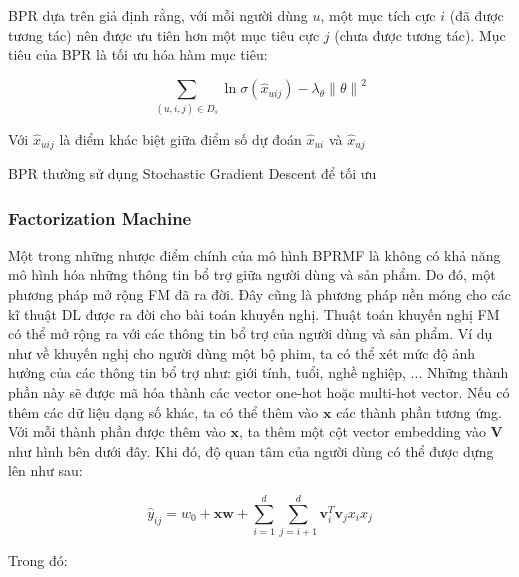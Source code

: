BPR dựa trên giả định rằng, với mỗi người dùng $ u $, một mục tích cực $ i $ (đã được
tương tác) nên được ưu tiên hơn một mục tiêu cực $ j $ (chưa được tương tác). Mục
tiêu của BPR là tối ưu hóa hàm mục tiêu:

\[
    \sum_{ (u, i, j) \in D_s} \ln{\sigma (\hat x_{uij}) - \lambda_\theta {\| \theta \|}^2 }
\]

Với $ \hat x_{uij} $ là điểm khác biệt giữa điểm số dự đoán $ \hat x_{ui} $ và
$ \hat x_{uj} $

BPR thường sử dụng Stochastic Gradient Descent để tối ưu

\subsubsection{Factorization Machine}
Một trong những nhược điểm chính của mô hình BPRMF là không có khả năng mô hình hóa
những thông tin bổ trợ giữa người dùng và sản phẩm. Do đó, một phương pháp mở rộng FM đã ra đời.
Đây cũng là phương pháp nền móng cho các kĩ thuật DL được ra đời cho bài toán khuyến nghị.
\newline
\indent Thuật toán khuyến nghị FM có thể mở rộng ra với các thông tin bổ trợ của người dùng và sản phẩm.
Ví dụ như về khuyến nghị cho người dùng một bộ phim, ta có thể xét mức độ ảnh hưởng của
các thông tin bổ trợ như: giới tính, tuổi, nghề nghiệp, ... Những thành phần này sẽ được mã hóa
thành các vector one-hot hoặc multi-hot vector. Nếu có thêm các dữ liệu dạng số khác,
ta có thể thêm vào $\mathbf{x}$ các thành phần tương ứng. Với mỗi thành phần được thêm vào
$\mathbf{x}$, ta thêm một cột vector embedding vào $\mathbf{V}$ như hình bên dưới đây.
Khi đó, độ quan tâm của người dùng có thể được dựng lên như sau:

$$\hat{y}_{ij} = w_0 + \mathbf{xw} + \sum_{i=1}^{d}\sum_{j=i+1}^{d} \mathbf{v}_i^T\mathbf{v}_jx_ix_j$$

Trong đó:

